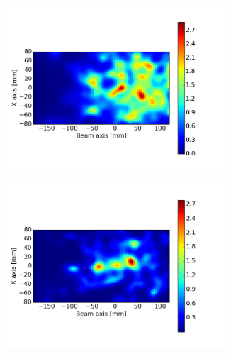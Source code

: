 \begin{figure}
\begin{subfigure}[b]{.5\textwidth}
\centering
\includegraphics[width=0.9\textwidth,clip=true,trim=0 70 130 90]{03_GraphicFiles/chapter4_HTsimu/new/recon_200pBunch/projection2D_Z_corr_r20.png}
\caption{}
\label{chap4::fig::2Drecon_MLEM_200p}
\end{subfigure}
\begin{subfigure}[b]{.5\textwidth}
\centering
\includegraphics[width=0.9\textwidth,clip=true,trim=0 70 130 90]{03_GraphicFiles/chapter4_HTsimu/projection2D_Z_corr_r20.png}
\caption{}
\label{chap4::fig::2Drecon_MLEM_1p}
\end{subfigure}
\begin{subfigure}[b]{.5\textwidth}
\centering

\end{subfigure}
\end{figure}
